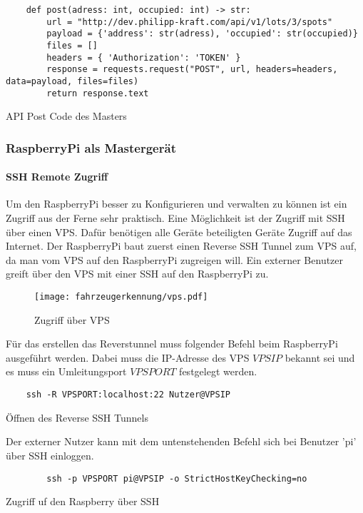 \begin{listing}[H]
    \begin{verbatim}
    def post(adress: int, occupied: int) -> str:
        url = "http://dev.philipp-kraft.com/api/v1/lots/3/spots"
        payload = {'address': str(adress), 'occupied': str(occupied)}
        files = []
        headers = { 'Authorization': 'TOKEN' }
        response = requests.request("POST", url, headers=headers, data=payload, files=files)
        return response.text
    \end{verbatim}
    \caption{API Post Code des Masters}
\end{listing}


\subsubsection{RaspberryPi als Mastergerät}
\paragraph{SSH Remote Zugriff} \mbox{} 

Um den RaspberryPi besser zu Konfigurieren und verwalten zu können ist ein Zugriff aus der Ferne sehr praktisch. Eine Möglichkeit ist der Zugriff mit SSH über einen VPS. Dafür benötigen alle Geräte beteiligten Geräte Zugriff auf das Internet.
Der RaspberryPi baut zuerst einen Reverse SSH Tunnel zum VPS auf, da man vom VPS auf den RaspberryPi zugreigen will. Ein externer Benutzer greift über den VPS mit einer SSH auf den RaspberryPi zu.

\begin{figure}[H]
    \centering
    \texttt{[image: fahrzeugerkennung/vps.pdf]}
    \caption{Zugriff über VPS}
\end{figure}
Für das erstellen das Reverstunnel muss folgender Befehl beim RaspberryPi ausgeführt werden. Dabei muss die IP-Adresse des VPS $VPSIP$ bekannt sei und es muss ein Umleitungsport $VPSPORT$ festgelegt werden.
\begin{listing}[H]
    \begin{verbatim}
    ssh -R VPSPORT:localhost:22 Nutzer@VPSIP
    \end{verbatim}
    \caption{Öffnen des Reverse SSH Tunnels}
\end{listing}

Der externer Nutzer kann mit dem untenstehenden Befehl sich bei Benutzer 'pi' über SSH einloggen.

\begin{listing}[H]
    \begin{verbatim}
        ssh -p VPSPORT pi@VPSIP -o StrictHostKeyChecking=no
    \end{verbatim}
    \caption{Zugriff uf den Raspberry über SSH}
\end{listing}




